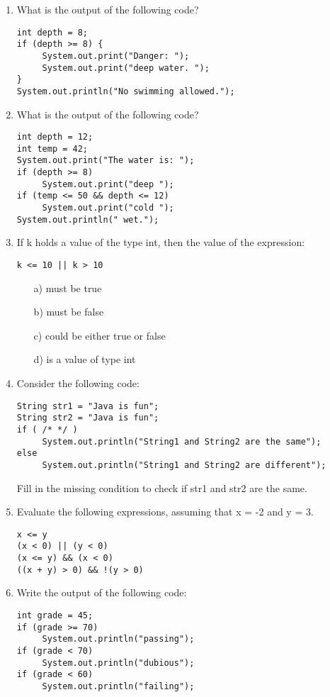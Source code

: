\setcounter{counter}{1}
\begin{enumerate}[label={\arabic{counter}\addtocounter{counter}{1}}.]

\item What is the output of the following code?
\begin{lstlisting}
int depth = 8;
if (depth >= 8) {
     System.out.print("Danger: ");
     System.out.print("deep water. ");
}
System.out.println("No swimming allowed.");
\end{lstlisting}

\item What is the output of the following code?
\begin{lstlisting}
int depth = 12;
int temp = 42;
System.out.print("The water is: ");
if (depth >= 8)
     System.out.print("deep ");
if (temp <= 50 && depth <= 12)
     System.out.print("cold ");
System.out.println(" wet.");
\end{lstlisting}

\item If k holds a value of the type int, then the value of the expression:
\begin{lstlisting}
k <= 10 || k > 10
\end{lstlisting}
\begin{enumerate}
\item[a)] must be true
\item[b)] must be false
\item[c)] could be either true or false
\item[d)] is a value of type int
\end{enumerate}

\item Consider the following code:
\begin{lstlisting}
String str1 = "Java is fun";
String str2 = "Java is fun";
if ( /* */ )
     System.out.println("String1 and String2 are the same");
else
     System.out.println("String1 and String2 are different");
\end{lstlisting}
Fill in the missing condition to check if str1 and str2 are the same.

\item Evaluate the following expressions, assuming that x = -2 and y = 3.
\begin{lstlisting} 
x <= y 
(x < 0) || (y < 0)
(x <= y) && (x < 0)
((x + y) > 0) && !(y > 0)
\end{lstlisting}

\item Write the output of the following code:
\begin{lstlisting}
int grade = 45;
if (grade >= 70)
     System.out.println("passing");
if (grade < 70)
     System.out.println("dubious");
if (grade < 60)
     System.out.println("failing");
\end{lstlisting}


\end{enumerate}
